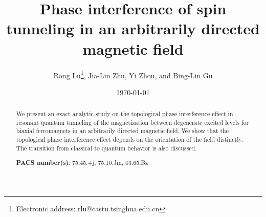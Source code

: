 




\begin{titlepage}

\title
{Phase interference of spin tunneling in an arbitrarily directed magnetic field}

\author{Rong L\"{u}\footnote 
{Electronic address: rlu@castu.tsinghua.edu.cn}, Jia-Lin Zhu, 
Yi Zhou, and Bing-Lin Gu} 
\address{Center for Advanced Study, 
Tsinghua University, Beijing 100084, People's Republic of China
}
\date{\today}
\maketitle
\begin{abstract}
We present an exact analytic study on 
the topological phase interference effect
in resonant quantum tunneling
of the magnetization between degenerate excited levels for biaxial ferromagnets
in an arbitrarily directed magnetic field.
We show that the topological phase interference effect depends
on the orientation of the field distinctly.
The transition from classical to quantum behavior is also discussed.

\noindent
{\bf PACS number(s)}:  75.45.+j, 75.10.Jm, 03.65.Bz
\end{abstract}

\end{titlepage}

